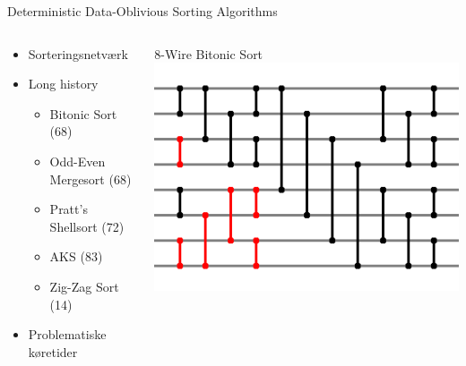 \begin{frame}{Deterministic Data-Oblivious Sorting Algorithms}
	\begin{columns}[T]
		\begin{column}{.48\textwidth}
			\begin{itemize}
				\item Sorteringsnetværk
				\item Long history
					\begin{itemize}
						\item Bitonic Sort (68)
						\item Odd-Even Mergesort (68)
						\item Pratt's Shellsort (72)
						\item AKS (83)
						\item Zig-Zag Sort (14)
					\end{itemize}
			\item Problematiske køretider
			\end{itemize}
		\end{column}
		\hfill
		\begin{column}{.48\textwidth}
			\begin{block}{8-Wire Bitonic Sort}
				\includegraphics[width= \textwidth]{network.png}
			\end{block}
		\end{column}
	\end{columns}
\end{frame}

